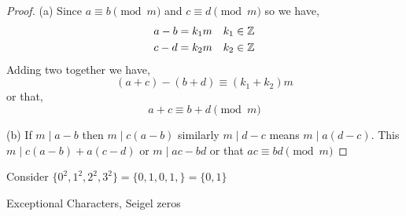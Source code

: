 \begin{proof}
    (a) Since $a \equiv b \pmod m$ and  $c \equiv d \pmod m$ so we have,  
    \begin{align*}
        a - b &= k_1m \quad k_1 \in \mathbb{Z}\\
        c - d &= k_2m \quad k_2 \in \mathbb{Z}
    \end{align*}
    Adding two together we have, 
    $$ (a + c) - (b + d) \equiv (k_1 + k_2)m $$  or that, 
    $$ a + c \equiv b + d \pmod m $$ 


    (b) If $ m \mid a - b$ then  $ m \mid c(a - b)$ similarly  $ m \mid d - c$  means  $m \mid a(d - c)$. This $ m \mid c(a - b) + a(c - d)$ or  $m \mid ac - bd $ or that $ac \equiv bd \pmod m$

\end{proof}

\vspace{1em}
\hline
\vspace{1em}

Consider $\{0^2, 1^2, 2^2, 3^2\} = \{0, 1, 0, 1, \} = \{0, 1\} $
\begin{note}
    Exceptional Characters, Seigel zeros
\end{note}

